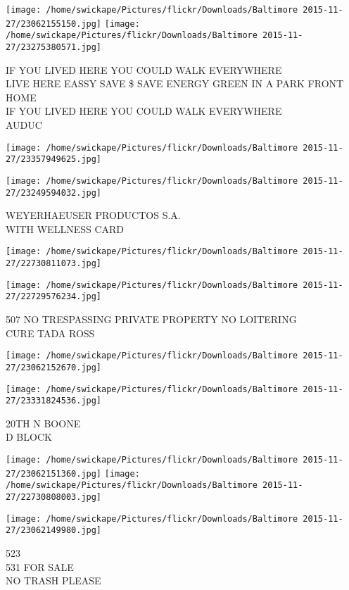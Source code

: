 \documentclass[10pt,letterpaper]{article}
\begin{document}
\texttt{[image: /home/swickape/Pictures/flickr/Downloads/Baltimore 2015-11-27/23062155150.jpg]}
\texttt{[image: /home/swickape/Pictures/flickr/Downloads/Baltimore 2015-11-27/23275380571.jpg]}

IF YOU LIVED HERE YOU COULD WALK EVERYWHERE\\
LIVE HERE EASSY SAVE \$ SAVE ENERGY GREEN IN A PARK FRONT HOME\\
IF YOU LIVED HERE YOU COULD WALK EVERYWHERE\\
AUDUC
\pagebreak

\texttt{[image: /home/swickape/Pictures/flickr/Downloads/Baltimore 2015-11-27/23357949625.jpg]}

\vspace{0.25in}
\texttt{[image: /home/swickape/Pictures/flickr/Downloads/Baltimore 2015-11-27/23249594032.jpg]}

WEYERHAEUSER PRODUCTOS S.A.\\
WITH WELLNESS CARD
\pagebreak

\texttt{[image: /home/swickape/Pictures/flickr/Downloads/Baltimore 2015-11-27/22730811073.jpg]}

\vspace{0.25in}
\texttt{[image: /home/swickape/Pictures/flickr/Downloads/Baltimore 2015-11-27/22729576234.jpg]}

507 NO TRESPASSING PRIVATE PROPERTY NO LOITERING\\
CURE TADA ROSS
\pagebreak

\texttt{[image: /home/swickape/Pictures/flickr/Downloads/Baltimore 2015-11-27/23062152670.jpg]}

\vspace{0.25in}
\texttt{[image: /home/swickape/Pictures/flickr/Downloads/Baltimore 2015-11-27/23331824536.jpg]}

20TH N BOONE\\
D BLOCK
\pagebreak

\texttt{[image: /home/swickape/Pictures/flickr/Downloads/Baltimore 2015-11-27/23062151360.jpg]}
\texttt{[image: /home/swickape/Pictures/flickr/Downloads/Baltimore 2015-11-27/22730808003.jpg]}

\vspace{0.25in}
\texttt{[image: /home/swickape/Pictures/flickr/Downloads/Baltimore 2015-11-27/23062149980.jpg]}

523\\
531 FOR SALE\\
NO TRASH PLEASE
\pagebreak
\end{document}
